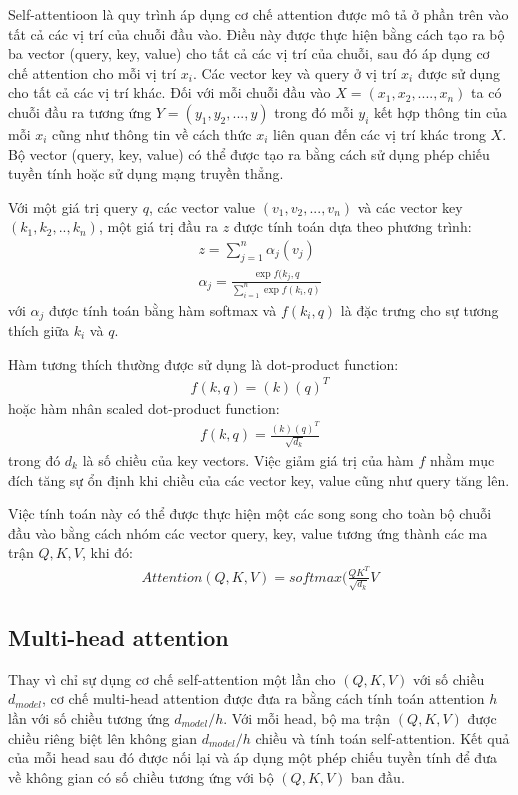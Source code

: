 \documentclass[14pt]{extreport}
\begin{document}
Self-attentioon là quy trình áp dụng cơ chế attention được mô tả ở phần trên vào tất cả các vị trí của chuỗi đầu vào. Điều này được thực hiện bằng cách tạo ra bộ ba vector (query, key, value) cho tất cả các vị trí của chuỗi, sau đó áp dụng cơ chế attention cho mỗi vị trí $x_{i}$. Các vector key và query ở vị trí $x_{i}$ được sử dụng cho tất cả các vị trí khác. Đối với mỗi chuỗi đầu vào $X=(x_{1}, x_{2},...., x_{n})$ ta có chuỗi đầu ra tương ứng $Y=(y_{1}, y_{2},..., y)$ trong đó mỗi $y_{i}$ kết hợp thông tin của mỗi $x_{i}$ cũng như thông tin về cách thức $x_{i}$ liên quan đến các vị trí khác trong $X$. Bộ vector (query, key, value) có thể được tạo ra bằng cách sử dụng phép chiếu tuyền tính hoặc sử dụng mạng truyền thẳng.

Với một giá trị query $q$, các vector value $(v_{1}, v_{2},...,v_{n})$ và các vector key $(k_{1}, k_{2}, .. , k_{n})$, một giá trị đầu ra $z$ được tính toán dựa theo phương trình:
\begin{align}
    z= \sum_{j=1}^{n}\alpha_{j}(v_{j})\\
    \alpha_{j}=\frac{\exp{f(k_{j}, q}}{\sum_{i=1}^{n}\exp{f(k_{i}, q)}}
\end{align}
với $\alpha_{j}$ được tính toán bằng hàm softmax và $f(k_{i},q)$ là đặc trưng cho sự tương thích giữa $k_{i}$ và $q$.

Hàm tương thích thường được sử dụng là dot-product function:
\begin{align}
    f(k,q)= (k)(q)^{T}
\end{align}
hoặc hàm nhân scaled dot-product function:
\begin{align}
    f(k,q)=\frac{(k)(q)^{T}}{\sqrt{d_{k}}} 
\end{align}
trong đó $d_{k}$ là số chiều của key vectors. Việc giảm giá trị của hàm $f$ nhằm mục đích tăng sự ổn định khi chiều của các vector key, value cũng như query tăng lên.

Việc tính toán này có thể được thực hiện một các song song cho toàn bộ chuỗi đầu vào bằng cách nhóm các vector query, key, value tương ứng thành các ma trận $Q, K, V$, khi đó:
\begin{align}
    Attention(Q, K, V)= softmax(\frac{QK^{T}}{\sqrt{d_{k}}}V
\end{align}

\subsection{Multi-head attention}
Thay vì chỉ sự dụng cơ chế self-attention một lần cho $(Q, K, V)$ với số chiều $d_{model}$, cơ chế multi-head attention được đưa ra bằng cách tính toán attention $h$  lần với số chiều tương ứng $d_{model}/h$. Với mỗi head, bộ ma trận $(Q, K, V)$ được chiều riêng biệt lên không gian $d_{model}/h$ chiều và tính toán self-attention. Kết quả của mỗi head sau đó được nối lại và áp dụng một phép chiếu tuyền tính để đưa về không gian có số chiều tương ứng với bộ $(Q, K, V)$ ban đầu.
\end{document}
